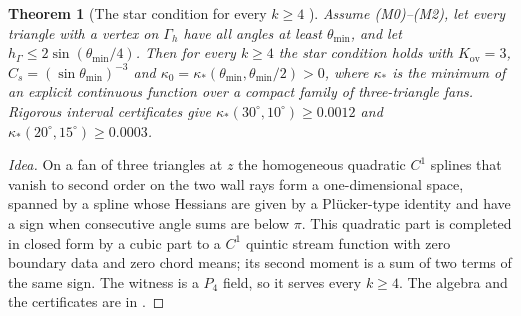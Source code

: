 \documentclass[pdflatex,sn-mathphys-num]{sn-jnl}
\theoremstyle{thmstyleone}
\newtheorem{theorem}{Theorem}[section]
\theoremstyle{thmstylethree}
\newcommand{\hG}{h_\Gamma}
\newcommand{\Gh}{\Gamma_h}
\begin{document}
\begin{theorem}[The star condition for every $k\ge4$ {\cite{PadhiExt}}]\label{thm:m3}
Assume (M0)--(M2), let every triangle with a vertex on $\Gh$ have all angles at least $\theta_{\min}$, and let $\hG\le2\sin(\theta_{\min}/4)$. Then for every $k\ge4$ the star condition holds with $K_{\mathrm{ov}}=3$, $C_s=(\sin\theta_{\min})^{-3}$ and $\kappa_0=\kappa_\ast(\theta_{\min},\theta_{\min}/2)>0$, where $\kappa_\ast$ is the minimum of an explicit continuous function over a compact family of three-triangle fans. Rigorous interval certificates give $\kappa_\ast(30^\circ,10^\circ)\ge0.0012$ and $\kappa_\ast(20^\circ,15^\circ)\ge0.0003$.
\end{theorem}

\begin{proof}[Idea]
On a fan of three triangles at $z$ the homogeneous quadratic $C^1$ splines that vanish to second order on the two wall rays form a one-dimensional space, spanned by a spline whose Hessians are given by a Pl\"ucker-type identity and have a sign when consecutive angle sums are below $\pi$. This quadratic part is completed in closed form by a cubic part to a $C^1$ quintic stream function with zero boundary data and zero chord means; its second moment is a sum of two terms of the same sign. The witness is a $P_4$ field, so it serves every $k\ge4$. The algebra and the certificates are in \cite{PadhiExt}.
\end{proof}
\end{document}
